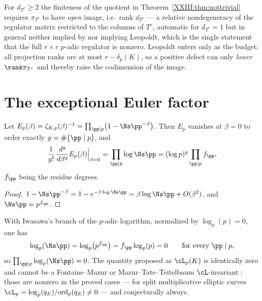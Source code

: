 \begin{remark}\label{XXIII:rem:relative}
For $d_{T^c}\ge2$ the finiteness of the quotient in Theorem~\ref{XXIII:thm:nottrivial} requires
$\pi_{T^c}$ to have \emph{open} image, i.e.\ rank $d_{T^c}$ --- a relative nondegeneracy of
the regulator matrix restricted to the columns of $T^c$, automatic for $d_{T^c}=1$ but in
general neither implied by nor implying Leopoldt, which is the single statement that the
full $r\times r$ $p$-adic regulator is nonzero. Leopoldt enters only as the budget: all
projection ranks are at most $r-\delta_p(K)$, so a positive defect can only \emph{lower}
$\rank\pi_{T^c}$ and thereby raise the codimension of the image.
\end{remark}

\section{The exceptional Euler factor}

\begin{proposition}\label{XXIII:prop:euler}
Let $E_p(\beta)=\zeta_{K,p}(\beta)^{-1}=\prod_{\pp\mid p}\bigl(1-\Ns\pp^{-\beta}\bigr)$. Then
$E_p$ vanishes at $\beta=0$ to order exactly $g=\#\{\pp\mid p\}$, and
\begin{equation}\label{XXIII:eq:leading}
\frac{1}{g!}\,\frac{d^g}{d\beta^g}E_p(\beta)\Big|_{\beta=0}
=\prod_{\pp\mid p}\log\Ns\pp=(\log p)^g\prod_{\pp\mid p}f_\pp ,
\end{equation}
$f_\pp$ being the residue degrees.
\end{proposition}

\begin{proof}
$1-\Ns\pp^{-\beta}=1-e^{-\beta\log\Ns\pp}=\beta\log\Ns\pp+O(\beta^2)$, and
$\Ns\pp=p^{f_\pp}$.
\end{proof}

\begin{theorem}\label{XXIII:thm:Lzero}
With Iwasawa's branch of the $p$-adic logarithm, normalized by $\log_p(p)=0$, one has
\[
\log_p(\Ns\pp)=\log_p\bigl(p^{f_\pp}\bigr)=f_\pp\log_p(p)=0
\qquad\text{for every }\pp\mid p ,
\]
so $\prod_{\pp\mid p}\log_p(\Ns\pp)=0$. The quantity proposed as
$\cL_p(K)$ is identically zero and cannot be a Fontaine--Mazur or
Mazur--Tate--Teitelbaum $\cL$-invariant \cite{MTT,GreenbergSteven}: those are nonzero in
the proved cases --- for split multiplicative elliptic curves
$\cL_p=\log_p(q_E)/\mathrm{ord}_p(q_E)\ne0$ --- and conjecturally always.
\end{theorem}

